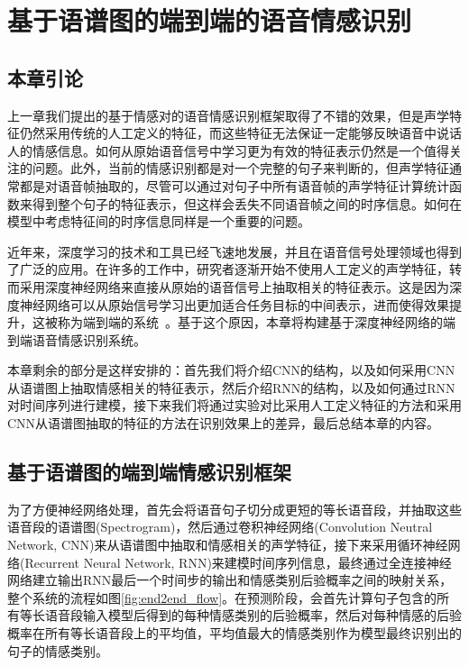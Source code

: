 \chapter{基于语谱图的端到端的语音情感识别}
\label{cha:end2end}

\section{本章引论}
\label{sec:end2end_intro}

上一章我们提出的基于情感对的语音情感识别框架取得了不错的效果，但是声学特征仍然采用传统的人工定义的特征，而这些特征无法保证一定能够反映语音中说话人的情感信息。如何从原始语音信号中学习更为有效的特征表示仍然是一个值得关注的问题。此外，当前的情感识别都是对一个完整的句子来判断的，但声学特征通常都是对语音帧抽取的，尽管可以通过对句子中所有语音帧的声学特征计算统计函数来得到整个句子的特征表示，但这样会丢失不同语音帧之间的时序信息。如何在模型中考虑特征间的时序信息同样是一个重要的问题。

近年来，深度学习的技术和工具已经飞速地发展，并且在语音信号处理领域也得到了广泛的应用。在许多的工作中，研究者逐渐开始不使用人工定义的声学特征，转而采用深度神经网络来直接从原始的语音信号上抽取相关的特征表示。这是因为深度神经网络可以从原始信号学习出更加适合任务目标的中间表示，进而使得效果提升，这被称为端到端的系统~\cite{Trigeorgis2016Adieu, Satt2017Efficient}。基于这个原因，本章将构建基于深度神经网络的端到端语音情感识别系统。

本章剩余的部分是这样安排的：首先我们将介绍CNN的结构，以及如何采用CNN从语谱图上抽取情感相关的特征表示，然后介绍RNN的结构，以及如何通过RNN对时间序列进行建模，接下来我们将通过实验对比采用人工定义特征的方法和采用CNN从语谱图抽取的特征的方法在识别效果上的差异，最后总结本章的内容。

\section{基于语谱图的端到端情感识别框架}
\label{sec:cnn_spectrogram_feature}

为了方便神经网络处理，首先会将语音句子切分成更短的等长语音段，并抽取这些语音段的语谱图(Spectrogram)，然后通过卷积神经网络(Convolution Neutral Network, CNN)来从语谱图中抽取和情感相关的声学特征，接下来采用循环神经网络(Recurrent Neural Network, RNN)来建模时间序列信息，最终通过全连接神经网络建立输出RNN最后一个时间步的输出和情感类别后验概率之间的映射关系，整个系统的流程如图\ref{fig:end2end_flow}。在预测阶段，会首先计算句子包含的所有等长语音段输入模型后得到的每种情感类别的后验概率，然后对每种情感的后验概率在所有等长语音段上的平均值，平均值最大的情感类别作为模型最终识别出的句子的情感类别。

